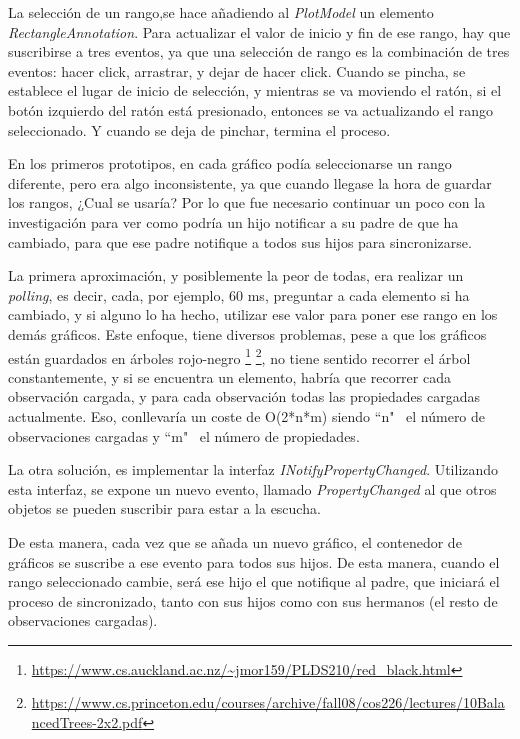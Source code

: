 La selecci\'on de un rango,se hace a\~nadiendo al \emph{PlotModel} un elemento \emph{RectangleAnnotation}.
Para actualizar el valor de inicio y fin de ese rango, hay que suscribirse a tres eventos, ya que una selecci\'on
de rango es la combinaci\'on de tres eventos: hacer click, arrastrar, y dejar de hacer click. Cuando se pincha,
se establece el lugar de inicio de selecci\'on, y mientras se va moviendo el rat\'on, si el bot\'on izquierdo
del rat\'on est\'a presionado, entonces se va actualizando el rango seleccionado. Y cuando se deja de pinchar,
termina el proceso.

En los primeros prototipos, en cada gr\'afico pod\'ia seleccionarse un rango diferente, pero era algo inconsistente, ya
que cuando llegase la hora de guardar los rangos, ¿Cual se usar\'ia? Por lo que fue necesario continuar un poco con la 
investigaci\'on para ver como podr\'ia un hijo notificar a su padre de que ha cambiado, para que ese padre notifique a todos
sus hijos para sincronizarse.

La primera aproximaci\'on, y posiblemente la peor de todas, era realizar un \emph{polling}, es decir, cada, por ejemplo, 60 ms,
preguntar a cada elemento si ha cambiado, y si alguno lo ha hecho, utilizar ese valor para poner ese rango en los dem\'as 
gr\'aficos. Este enfoque, tiene diversos problemas, pese a que los gr\'aficos est\'an guardados en \'arboles rojo-negro
\footnote{\url{https://www.cs.auckland.ac.nz/~jmor159/PLDS210/red\_black.html}}
\footnote{\url{https://www.cs.princeton.edu/courses/archive/fall08/cos226/lectures/10BalancedTrees-2x2.pdf}},
no tiene sentido recorrer el \'arbol constantemente, y si se encuentra un elemento, habr\'ia que recorrer cada observaci\'on cargada,
y para cada observaci\'on todas las propiedades cargadas actualmente. Eso,
conllevar\'ia un coste de O(2*n*m) siendo ``n" \ el n\'umero de observaciones cargadas y ``m" \ el n\'umero de propiedades.

La otra soluci\'on, es implementar la interfaz \emph{INotifyPropertyChanged}. Utilizando esta interfaz, se expone un 
nuevo evento, llamado \emph{PropertyChanged} al que otros objetos se pueden suscribir para estar a la escucha.

De esta manera, cada vez que se a\~nada un nuevo gr\'afico, el contenedor de gr\'aficos se suscribe a ese evento para todos
sus hijos. De esta manera, cuando el rango seleccionado cambie, ser\'a ese hijo el que notifique al padre, que iniciar\'a
el proceso de sincronizado, tanto con sus hijos como con sus hermanos (el resto de observaciones cargadas).

